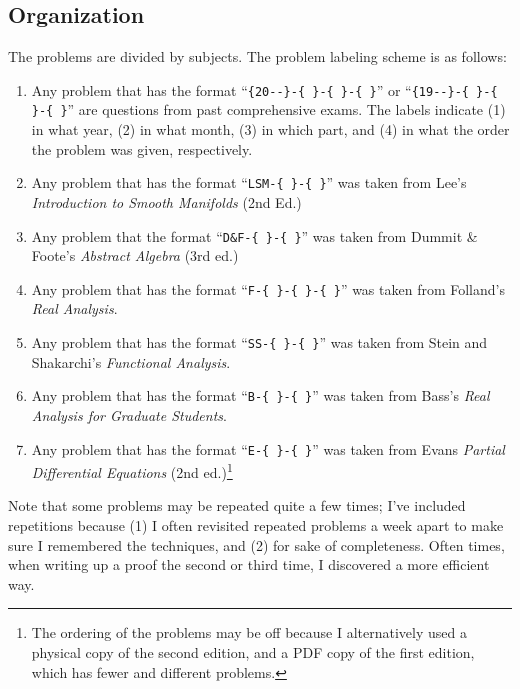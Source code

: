 \documentclass{article}
\begin{document}
	\subsection{Organization}
	The problems are divided by subjects. The problem labeling scheme is as follows: \vspace{-0.25cm}
	\begin{enumerate}[itemsep=-2pt,label = (\arabic{*})]
		\item Any problem that has the format ``\verb|{20--}-{ }-{ }-{ }|'' or ``\verb|{19--}-{ }-{ }-{ }|'' are questions from past comprehensive exams. The labels indicate (1) in what year, (2) in what month, (3) in which part, and (4) in what the order the problem was given, respectively. 
		\item Any problem that has the format ``\verb|LSM-{ }-{ }|'' was taken from Lee's \textit{Introduction to Smooth Manifolds} (2nd Ed.)
		\item Any problem that the format ``\verb|D&F-{ }-{ }|'' was taken from Dummit \& Foote's \textit{Abstract Algebra} (3rd ed.)
		\item Any problem that has the format ``\verb|F-{ }-{ }-{ }|'' was taken from Folland's \textit{Real Analysis}.
		\item Any problem that has the format ``\verb|SS-{ }-{ }|'' was taken from Stein and Shakarchi's \textit{Functional Analysis}.
		\item Any problem that has the format ``\verb|B-{ }-{ }|'' was taken from Bass's \textit{Real Analysis for Graduate Students}. 
		\item Any problem that has the format ``\verb|E-{ }-{ }|'' was taken from Evans \textit{Partial Differential Equations} (2nd ed.)\footnote{The ordering of the problems may be off because I alternatively used a physical copy of the second edition, and a PDF copy of the first edition, which has fewer and different problems.}
	\end{enumerate}
	
	Note that some problems may be repeated quite a few times; I've included repetitions because (1) I often revisited repeated problems a week apart to make sure I remembered the techniques, and (2) for sake of completeness. Often times, when writing up a proof the second or third time, I discovered a more efficient way. 
	
\end{document}
